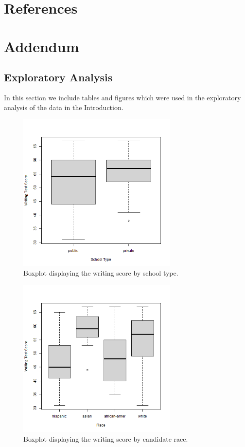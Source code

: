 \documentclass[10pt, a4paper]{article}
\begin{document}
	
	\section{References}
	\printbibliography[heading=none]
	
	\newpage
	\section{Addendum}
	\label{sec::addendum}
	
	\subsection{Exploratory Analysis}
	In this section we include tables and figures which were used in the exploratory analysis of the data in the Introduction. 
	
	\begin{figure}
		\includegraphics[width=8cm]{write_schtyp_boxplot.png}
		\centering
		\caption{Boxplot displaying the writing score by school type.}
		\label{fig::write_schtyp_boxplot}
	\end{figure}
	
	\begin{figure}
		\includegraphics[width=8cm]{write_race_boxplot.png}
		\centering
		\caption{Boxplot displaying the writing score by candidate race.}
		\label{fig::write_race_boxplot}
	\end{figure}
	
\end{document}
